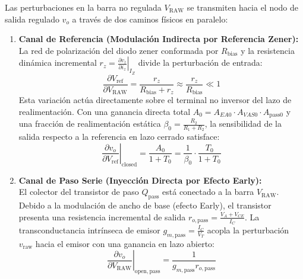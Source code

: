 Las perturbaciones en la barra no regulada $V_{\mathrm{RAW}}$ se transmiten hacia el nodo de salida regulado $v_o$ a través de dos caminos físicos en paralelo:
\begin{enumerate}
    \item \textbf{Canal de Referencia (Modulación Indirecta por Referencia Zener):}\\
    La red de polarización del diodo zener conformada por $R_{\mathrm{bias}}$ y la resistencia dinámica incremental $r_z = \left.\frac{\partial v_z}{\partial i_z}\right|_{I_Z}$ divide la perturbación de entrada:
    \begin{equation}
        \frac{\partial V_{\mathrm{ref}}}{\partial V_{\mathrm{RAW}}} = \frac{r_z}{R_{\mathrm{bias}} + r_z} \approx \frac{r_z}{R_{\mathrm{bias}}} \ll 1
        \label{eq:zener_line_sensitivity}
    \end{equation}
    Esta variación actúa directamente sobre el terminal no inversor del lazo de realimentación. Con una ganancia directa total $A_0 = A_{EA0} \cdot A_{VAS0} \cdot A_{\mathrm{pass}0}$ y una fracción de realimentación estática $\beta_0 = \frac{R_2}{R_1 + R_2}$, la sensibilidad de la salida respecto a la referencia en lazo cerrado satisface:
    \begin{equation}
        \left. \frac{\partial v_o}{\partial V_{\mathrm{ref}}} \right|_{\mathrm{closed}} = \frac{A_0}{1 + T_0} = \frac{1}{\beta_0} \cdot \frac{T_0}{1 + T_0}
    \end{equation}
    \item \textbf{Canal de Paso Serie (Inyección Directa por Efecto Early):}\\
    El colector del transistor de paso $Q_{\mathrm{pass}}$ está conectado a la barra $V_{\mathrm{RAW}}$. Debido a la modulación de ancho de base (efecto Early), el transistor presenta una resistencia incremental de salida $r_{o,\mathrm{pass}} = \frac{V_A + V_{CE}}{I_C}$. La transconductancia intrínseca de emisor $g_{m,\mathrm{pass}} = \frac{I_C}{V_T}$ acopla la perturbación $v_{\mathrm{raw}}$ hacia el emisor con una ganancia en lazo abierto:
    \begin{equation}
        \left. \frac{\partial v_o}{\partial V_{\mathrm{RAW}}} \right|_{\mathrm{open,pass}} = \frac{1}{g_{m,\mathrm{pass}} r_{o,\mathrm{pass}}}
    \end{equation}
\end{enumerate}

